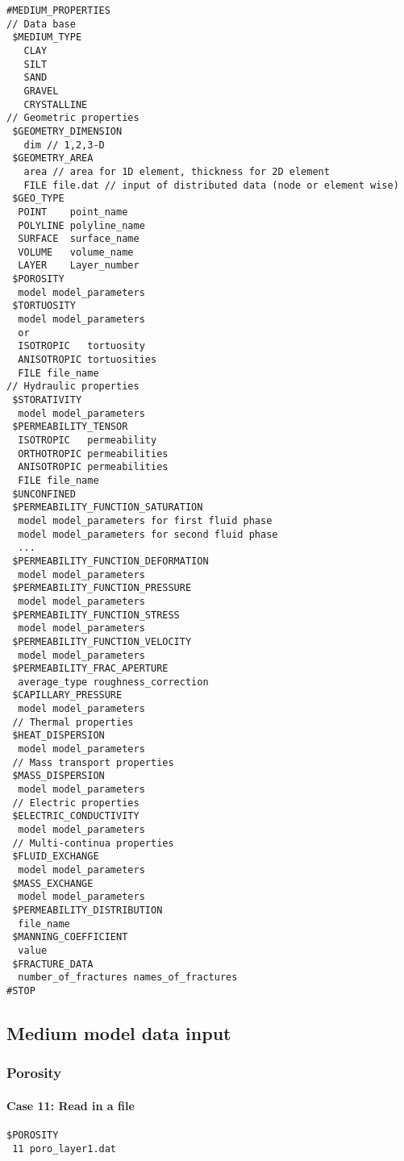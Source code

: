 \begin{verbatim}
#MEDIUM_PROPERTIES
// Data base
 $MEDIUM_TYPE
   CLAY
   SILT
   SAND
   GRAVEL
   CRYSTALLINE
// Geometric properties
 $GEOMETRY_DIMENSION
   dim // 1,2,3-D
 $GEOMETRY_AREA
   area // area for 1D element, thickness for 2D element
   FILE file.dat // input of distributed data (node or element wise)
 $GEO_TYPE
  POINT    point_name
  POLYLINE polyline_name
  SURFACE  surface_name
  VOLUME   volume_name
  LAYER    Layer_number
 $POROSITY
  model model_parameters
 $TORTUOSITY
  model model_parameters
  or
  ISOTROPIC   tortuosity
  ANISOTROPIC tortuosities
  FILE file_name
// Hydraulic properties
 $STORATIVITY
  model model_parameters
 $PERMEABILITY_TENSOR
  ISOTROPIC   permeability
  ORTHOTROPIC permeabilities
  ANISOTROPIC permeabilities
  FILE file_name
 $UNCONFINED
 $PERMEABILITY_FUNCTION_SATURATION
  model model_parameters for first fluid phase
  model model_parameters for second fluid phase
  ...
 $PERMEABILITY_FUNCTION_DEFORMATION
  model model_parameters
 $PERMEABILITY_FUNCTION_PRESSURE
  model model_parameters
 $PERMEABILITY_FUNCTION_STRESS
  model model_parameters
 $PERMEABILITY_FUNCTION_VELOCITY
  model model_parameters
 $PERMEABILITY_FRAC_APERTURE
  average_type roughness_correction
 $CAPILLARY_PRESSURE
  model model_parameters
 // Thermal properties
 $HEAT_DISPERSION
  model model_parameters
 // Mass transport properties
 $MASS_DISPERSION
  model model_parameters
 // Electric properties
 $ELECTRIC_CONDUCTIVITY
  model model_parameters
 // Multi-continua properties
 $FLUID_EXCHANGE
  model model_parameters
 $MASS_EXCHANGE
  model model_parameters
 $PERMEABILITY_DISTRIBUTION
  file_name
 $MANNING_COEFFICIENT
  value
 $FRACTURE_DATA
  number_of_fractures names_of_fractures
#STOP
\end{verbatim}

\subsection{Medium model data input}
\subsubsection{Porosity}
\paragraph*{Case 11: Read in a file}
\begin{verbatim}
$POROSITY
 11 poro_layer1.dat
\end{verbatim}

